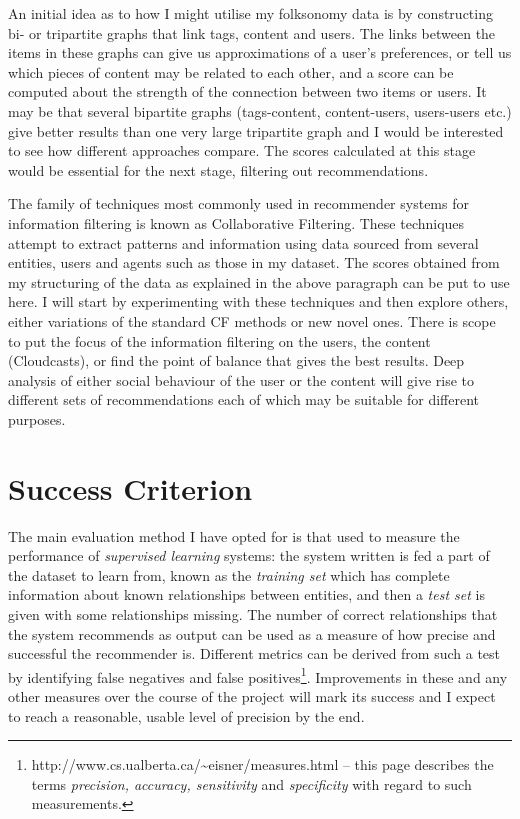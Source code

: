 An initial idea as to how I might utilise my folksonomy data is by constructing bi- or tripartite graphs that link tags, content and users. The links between the items in these graphs can give us approximations of a user's preferences, or tell us which pieces of content may be related to each other, and a score can be computed about the strength of the connection between two items or users. It may be that several bipartite graphs (tags-content, content-users, users-users etc.) give better results than one very large tripartite graph and I would be interested to see how different approaches compare. The scores calculated at this stage would be essential for the next stage, filtering out recommendations.

The family of techniques most commonly used in recommender systems for information filtering is known as Collaborative Filtering. These techniques attempt to extract patterns and information using data sourced from several entities, users and agents such as those in my dataset. The scores obtained from my structuring of the data as explained in the above paragraph can be put to use here. I will start by experimenting with these techniques and then explore others, either variations of the standard CF methods or new novel ones. There is scope to put the focus of the information filtering on the users, the content (Cloudcasts), or find the point of balance that gives the best results. Deep analysis of either social behaviour of the user or the content will give rise to different sets of recommendations each of which may be suitable for different purposes.

\section{Success Criterion}

The main evaluation method I have opted for is that used to measure the performance of \textit{supervised learning} systems: the system written is fed a part of the dataset to learn from, known as the \textit{training set} which has complete information about known relationships between entities, and then a \textit{test set} is given with some relationships missing. The number of correct relationships that the system recommends as output can be used as a measure of how precise and successful the recommender is. Different metrics can be derived from such a test by identifying false negatives and false positives\footnote{http://www.cs.ualberta.ca/\textasciitilde eisner/measures.html -- this page describes the terms \textit{precision, accuracy, sensitivity} and \textit{specificity} with regard to such measurements.}. Improvements in these and any other measures over the course of the project will mark its success and I expect to reach a reasonable, usable level of precision by the end.


